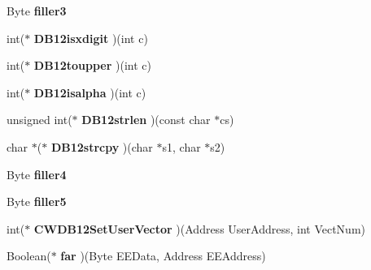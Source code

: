 \begin{DoxyCompactItemize}
\item 
\hypertarget{struct_user_f_n_ab9adfb39f2c2b1c1f9d27dec1bb1cf30}{}Byte {\bfseries filler3}\label{struct_user_f_n_ab9adfb39f2c2b1c1f9d27dec1bb1cf30}

\item 
\hypertarget{struct_user_f_n_a95198c9ef1c53cac142332417b9108d7}{}int($\ast$ {\bfseries D\+B12isxdigit} )(int c)\label{struct_user_f_n_a95198c9ef1c53cac142332417b9108d7}

\item 
\hypertarget{struct_user_f_n_a002e3e0a1ecb6b2c57490bcc25c476be}{}int($\ast$ {\bfseries D\+B12toupper} )(int c)\label{struct_user_f_n_a002e3e0a1ecb6b2c57490bcc25c476be}

\item 
\hypertarget{struct_user_f_n_a2dc0c7b72c864b2b25c17a827e87b064}{}int($\ast$ {\bfseries D\+B12isalpha} )(int c)\label{struct_user_f_n_a2dc0c7b72c864b2b25c17a827e87b064}

\item 
\hypertarget{struct_user_f_n_ae24d07dca2876a7c9a2e6e4bf6320c93}{}unsigned int($\ast$ {\bfseries D\+B12strlen} )(const char $\ast$cs)\label{struct_user_f_n_ae24d07dca2876a7c9a2e6e4bf6320c93}

\item 
\hypertarget{struct_user_f_n_a05022572dcfaf9548451d4ccc990b44c}{}char $\ast$($\ast$ {\bfseries D\+B12strcpy} )(char $\ast$s1, char $\ast$s2)\label{struct_user_f_n_a05022572dcfaf9548451d4ccc990b44c}

\item 
\hypertarget{struct_user_f_n_abbd98a7c9b4d72a3e40f17f9356d404a}{}Byte {\bfseries filler4}\label{struct_user_f_n_abbd98a7c9b4d72a3e40f17f9356d404a}

\item 
\hypertarget{struct_user_f_n_a20883a6c1916272dd79dc36241082020}{}Byte {\bfseries filler5}\label{struct_user_f_n_a20883a6c1916272dd79dc36241082020}

\item 
\hypertarget{struct_user_f_n_a36e05c69b9819dfb880cd4e85c62c5b9}{}int($\ast$ {\bfseries C\+W\+D\+B12\+Set\+User\+Vector} )(Address User\+Address, int Vect\+Num)\label{struct_user_f_n_a36e05c69b9819dfb880cd4e85c62c5b9}

\item 
\hypertarget{struct_user_f_n_a9eca173b9665eec76fd75d383067d6e3}{}Boolean($\ast$ {\bfseries far} )(Byte E\+E\+Data, Address E\+E\+Address)\label{struct_user_f_n_a9eca173b9665eec76fd75d383067d6e3}


\end{DoxyCompactItemize}
